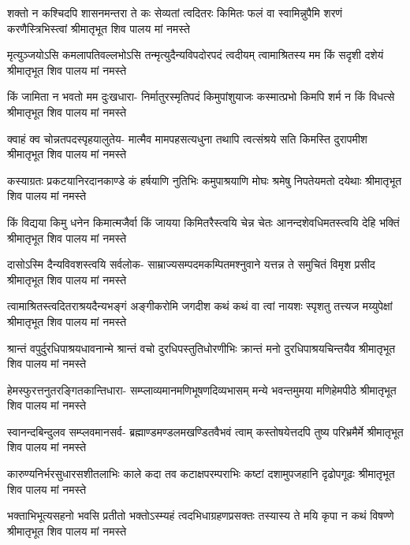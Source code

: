 \fourlineindentedshloka
{शक्तो न कश्चिदपि शासनमन्तरा ते}
{कः सेव्यतां त्वदितरः किमितः फलं वा}
{स्वामिन्नुपैमि शरणं करणैस्त्रिभिस्त्वां}
{श्रीमातृभूत शिव पालय मां नमस्ते} %

\fourlineindentedshloka
{मृत्युञ्जयोऽसि कमलापतिवल्लभोऽसि}
{तन्मृत्युदैन्यविपदोरपदं त्वदीयम्}
{त्वामाश्रितस्य मम किं सदृशी दशेयं}
{श्रीमातृभूत शिव पालय मां नमस्ते} %

\fourlineindentedshloka
{किं जामिता न भवतो मम दुःखधारा-}
{निर्मातुरस्मृतिपदं किमुपांशुयाजः}
{कस्मात्प्रभो किमपि शर्म न किं विधत्से}
{श्रीमातृभूत शिव पालय मां नमस्ते} %

\fourlineindentedshloka
{क्वाहं क्व चोन्नतपदस्पृहयालुतेय-}
{मात्मैव मामपहसत्यधुना तथापि}
{त्वत्संश्रये सति किमस्ति दुरापमीश}
{श्रीमातृभूत शिव पालय मां नमस्ते} %

\fourlineindentedshloka
{कस्याग्रतः प्रकटयानिरदानकाण्डे}
{कं हर्षयाणि नुतिभिः कमुपाश्रयाणि}
{मोघः श्रमेषु निपतेयमतो दयेथाः}
{श्रीमातृभूत शिव पालय मां नमस्ते} %

\fourlineindentedshloka
{किं विद्यया किमु धनेन किमात्मजैर्वा}
{किं जायया किमितरैस्त्वयि चेन्न चेतः}
{आनन्दशेवधिमतस्त्वयि देहि भक्तिं}
{श्रीमातृभूत शिव पालय मां नमस्ते} %

\fourlineindentedshloka
{दासोऽस्मि दैन्यविवशस्त्वयि सर्वलोक-}
{साम्राज्यसम्पदमकम्पितमश्नुवाने}
{यत्तन्न ते समुचितं विमृश प्रसीद}
{श्रीमातृभूत शिव पालय मां नमस्ते} %

\fourlineindentedshloka
{त्वामाश्रितस्त्वदितराश्रयदैन्यभङ्गं}
{अङ्गीकरोमि जगदीश कथं कथं वा}
{त्वां नायशः स्पृशतु तत्त्यज मय्युपेक्षां}
{श्रीमातृभूत शिव पालय मां नमस्ते} %

\fourlineindentedshloka
{श्रान्तं वपुर्दुरधिपाश्रयधावनान्मे}
{श्रान्तं वचो दुरधिपस्तुतिधोरणीभिः}
{क्रान्तं मनो दुरधिपाश्रयचिन्तयैव}
{श्रीमातृभूत शिव पालय मां नमस्ते} %

\fourlineindentedshloka
{हेमस्फुरत्तनुतरङ्गितकान्तिधारा-}
{सम्प्लाव्यमानमणिभूषणदिव्यभासम्}
{मन्ये भवन्तमुमया मणिहेमपीठे}
{श्रीमातृभूत शिव पालय मां नमस्ते} %

\fourlineindentedshloka
{स्वानन्दबिन्दुलव सम्प्लवमानसर्व-}
{ब्रह्माण्डमण्डलमखण्डितवैभवं त्वाम्}
{कस्तोषयेत्तदपि तुष्य परिभ्रमैर्मे}
{श्रीमातृभूत शिव पालय मां नमस्ते} %

\fourlineindentedshloka
{कारुण्यनिर्भरसुधारसशीतलाभिः}
{काले कदा तव कटाक्षपरम्पराभिः}
{कष्टां दशामुपजहानि दृढोपगूढः}
{श्रीमातृभूत शिव पालय मां नमस्ते} %

\fourlineindentedshloka
{भक्ताभिभूत्यसहनो भवसि प्रतीतो}
{भक्तोऽस्म्यहं त्वदभिधाग्रहणप्रसक्तः}
{तस्यास्य ते मयि कृपा न कथं विषण्णे}
{श्रीमातृभूत शिव पालय मां नमस्ते} %

